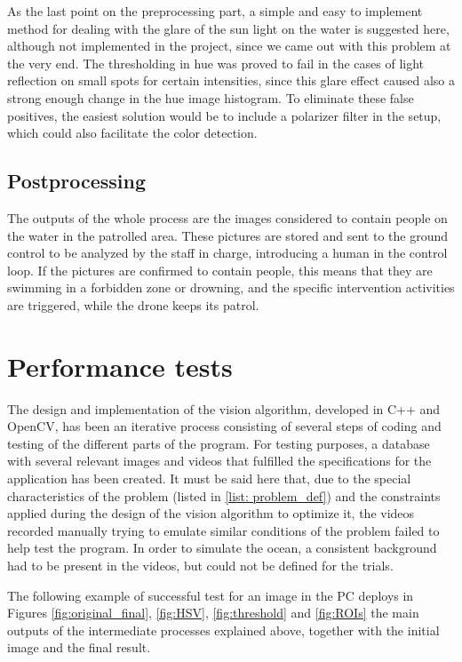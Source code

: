 As the last point on the preprocessing part, a simple and easy to implement method for dealing with the glare
of the sun light on the water is suggested here, although not implemented in the project, since we came out with this problem at the very end.
The thresholding in hue was proved to fail in the cases of light reflection on small spots for certain intensities,
since this glare effect caused also a strong enough change in the hue image histogram. 
To eliminate these false positives, the easiest solution would be to include a polarizer filter in the setup,
which could also facilitate the color detection. 

\subsection{Postprocessing}
The outputs of the whole process are the images considered to contain people on the water in the patrolled area. 
These pictures are stored and sent to the ground control to be analyzed by the staff in charge,
introducing a human in the control loop.
If the pictures are confirmed to contain people, this means that they are swimming in a forbidden zone or drowning,
and the specific intervention activities are triggered, while the drone keeps its patrol. 

\section{Performance tests}
The design and implementation of the vision algorithm, developed in C++ and OpenCV, has been an iterative
process consisting of several steps of coding and testing of the different parts of the program. 
For testing purposes, a database with several relevant images and videos that fulfilled the specifications for
the application has been created. 
It must be said here that, due to the special characteristics of the problem (listed in \ref{list: problem_def})
and the constraints applied during the design of the vision algorithm to optimize it,
the videos recorded manually trying to emulate similar conditions of the problem failed to help test the program. 
In order to simulate the ocean, a consistent background had to be present in the videos,
but could not be defined for the trials. 


The following example of successful test for an image in the PC deploys in Figures \ref{fig:original_final},
\ref{fig:HSV}, \ref{fig:threshold} and \ref{fig:ROIs} the main outputs of the intermediate processes explained above,
together with the initial image and the final result. 

